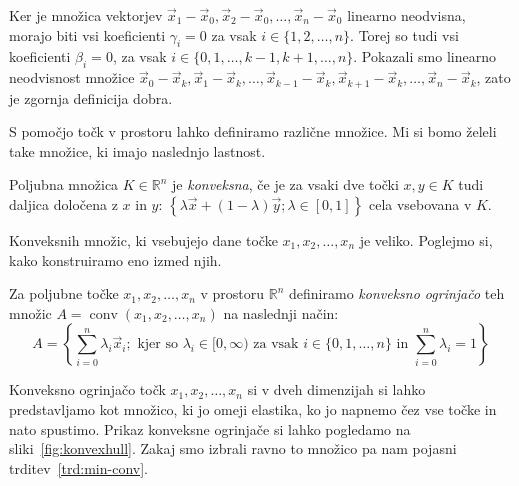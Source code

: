 \documentclass[mat1]{fmfdelo}
\newcommand{\R}{\mathbb R}
\DeclareMathOperator{\conv}{conv}
\newcommand{\0}{\underline{0}}
\begin{document}
Ker je množica vektorjev $\vec{x}_1 - \vec{x}_0, \vec{x}_2 - \vec{x}_0, \dots , \vec{x}_n - \vec{x}_0$ linearno neodvisna, morajo biti vsi koeficienti $\gamma_i = 0$ za vsak $i \in \{1, 2, \dots, n \}$. Torej so tudi vsi koeficienti $\beta_i = 0$, za vsak $i \in \{0, 1, \dots, k-1, k+1, \dots, n \}$. Pokazali smo linearno neodvisnost množice $\vec{x}_0 - \vec{x}_k, \vec{x}_1 - \vec{x}_k, \dots , \vec{x}_{k-1} - \vec{x}_k, \vec{x}_{k+1} - \vec{x}_k, \dots, \vec{x}_n - \vec{x}_k$, zato je zgornja definicija dobra. 

S pomočjo točk v prostoru lahko definiramo različne množice. Mi si bomo želeli take množice, ki imajo naslednjo lastnost.
\begin{definicija}
Poljubna množica $K \in \R^n$ je \emph{konveksna}, če je za vsaki dve točki $x, y \in K$ tudi daljica določena z $x$ in $y$: 
$\left \{ \lambda \vec{x} + (1 - \lambda) \vec{y}; \lambda \in  [0, 1] \right \}$ 
cela vsebovana v $K$.
\end{definicija}
Konveksnih množic, ki vsebujejo dane točke $x_1, x_2, \dots, x_n$ je veliko. Poglejmo si, kako konstruiramo eno izmed njih.
\begin{definicija}
Za poljubne točke $x_1, x_2, \dots, x_n$ v prostoru $\R^n$ definiramo \emph{konveksno ogrinjačo} teh množic $A = \conv(x_1, x_2, \dots, x_n)$ na naslednji način:
$$A = \left \{ \sum\limits_{i=0}^n \lambda_i \vec{x}_i; \text{ kjer so } \lambda_i \in [0, \infty) \text{ za vsak } i \in \{0, 1, \dots, n \} \text{ in } \sum\limits_{i=0}^n \lambda_i = 1  \right \}$$
\end{definicija}
Konveksno ogrinjačo točk $x_1, x_2, \dots, x_n$ si v dveh dimenzijah si lahko predstavljamo kot množico, ki jo omeji elastika, ko jo napnemo čez vse točke in nato spustimo. Prikaz konveksne ogrinjače si lahko pogledamo na sliki~\ref{fig:konvexhull}. Zakaj smo izbrali ravno to množico pa nam pojasni trditev~\ref{trd:min-conv}.
\end{document}

